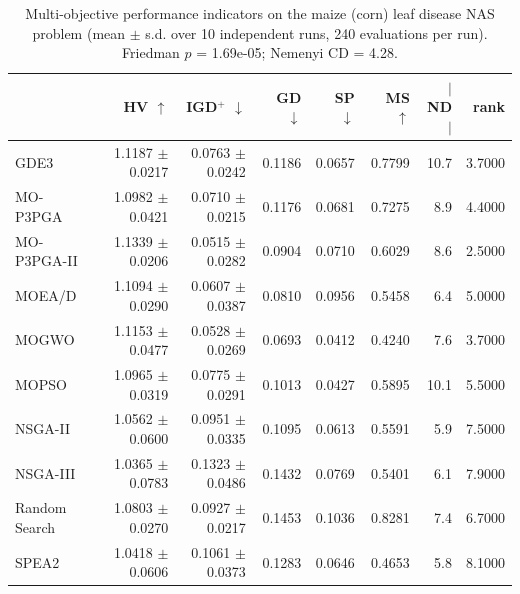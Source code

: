 \begin{table}[htbp]
\centering
\caption{Multi-objective performance indicators on the maize (corn) leaf disease NAS problem (mean $\pm$ s.d. over 10 independent runs, 240 evaluations per run). Friedman $p$ = 1.69e-05; Nemenyi CD = 4.28.}
\label{tab:indicators}
\footnotesize
\begin{tabular}{lrrrrrrr}
\toprule
 & HV $\uparrow$ & IGD$^+$ $\downarrow$ & GD $\downarrow$ & SP $\downarrow$ & MS $\uparrow$ & $|$ND$|$ & rank \\
\midrule
GDE3 & 1.1187 $\pm$ 0.0217 & 0.0763 $\pm$ 0.0242 & 0.1186 & 0.0657 & 0.7799 & 10.7 & 3.7000 \\
MO-P3PGA & 1.0982 $\pm$ 0.0421 & 0.0710 $\pm$ 0.0215 & 0.1176 & 0.0681 & 0.7275 & 8.9 & 4.4000 \\
MO-P3PGA-II & 1.1339 $\pm$ 0.0206 & 0.0515 $\pm$ 0.0282 & 0.0904 & 0.0710 & 0.6029 & 8.6 & 2.5000 \\
MOEA/D & 1.1094 $\pm$ 0.0290 & 0.0607 $\pm$ 0.0387 & 0.0810 & 0.0956 & 0.5458 & 6.4 & 5.0000 \\
MOGWO & 1.1153 $\pm$ 0.0477 & 0.0528 $\pm$ 0.0269 & 0.0693 & 0.0412 & 0.4240 & 7.6 & 3.7000 \\
MOPSO & 1.0965 $\pm$ 0.0319 & 0.0775 $\pm$ 0.0291 & 0.1013 & 0.0427 & 0.5895 & 10.1 & 5.5000 \\
NSGA-II & 1.0562 $\pm$ 0.0600 & 0.0951 $\pm$ 0.0335 & 0.1095 & 0.0613 & 0.5591 & 5.9 & 7.5000 \\
NSGA-III & 1.0365 $\pm$ 0.0783 & 0.1323 $\pm$ 0.0486 & 0.1432 & 0.0769 & 0.5401 & 6.1 & 7.9000 \\
Random Search & 1.0803 $\pm$ 0.0270 & 0.0927 $\pm$ 0.0217 & 0.1453 & 0.1036 & 0.8281 & 7.4 & 6.7000 \\
SPEA2 & 1.0418 $\pm$ 0.0606 & 0.1061 $\pm$ 0.0373 & 0.1283 & 0.0646 & 0.4653 & 5.8 & 8.1000 \\
\bottomrule
\end{tabular}
\end{table}
